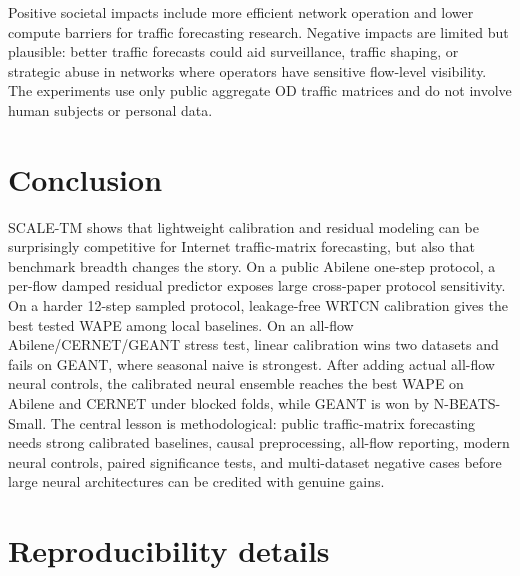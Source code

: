 \documentclass{article}
\begin{document}
Positive societal impacts include more efficient network operation and lower compute barriers for traffic forecasting research. Negative impacts are limited but plausible: better traffic forecasts could aid surveillance, traffic shaping, or strategic abuse in networks where operators have sensitive flow-level visibility. The experiments use only public aggregate OD traffic matrices and do not involve human subjects or personal data.

\section{Conclusion}

SCALE-TM shows that lightweight calibration and residual modeling can be surprisingly competitive for Internet traffic-matrix forecasting, but also that benchmark breadth changes the story. On a public Abilene one-step protocol, a per-flow damped residual predictor exposes large cross-paper protocol sensitivity. On a harder 12-step sampled protocol, leakage-free WRTCN calibration gives the best tested WAPE among local baselines. On an all-flow Abilene/CERNET/GEANT stress test, linear calibration wins two datasets and fails on GEANT, where seasonal naive is strongest. After adding actual all-flow neural controls, the calibrated neural ensemble reaches the best WAPE on Abilene and CERNET under blocked folds, while GEANT is won by N-BEATS-Small. The central lesson is methodological: public traffic-matrix forecasting needs strong calibrated baselines, causal preprocessing, all-flow reporting, modern neural controls, paired significance tests, and multi-dataset negative cases before large neural architectures can be credited with genuine gains.




\appendix

\section{Reproducibility details}
\end{document}
